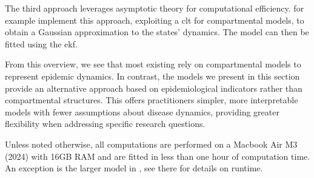 The third approach leverages asymptotic theory for computational efficiency. \citep{ODea2022Semiparametric} for example implement this approach, exploiting a \acrshort{clt} for compartmental models, to obtain a Gaussian approximation to the states' dynamics. The model can then be fitted using the \acrshort{ekf}.

From this overview, we see that most existing  rely on compartmental models to represent epidemic dynamics. In contrast, the models we present in this section provide an alternative approach based on epidemiological indicators rather than compartmental structures. This offers practitioners simpler, more interpretable models with fewer assumptions about disease dynamics, providing greater flexibility when addressing specific research questions.

Unless noted otherwise, all computations are performed on a Macbook Air M3 (2024) with 16GB RAM and are fitted in less than one hour of computation time.  An exception is the larger model in , see there for details on runtime.


